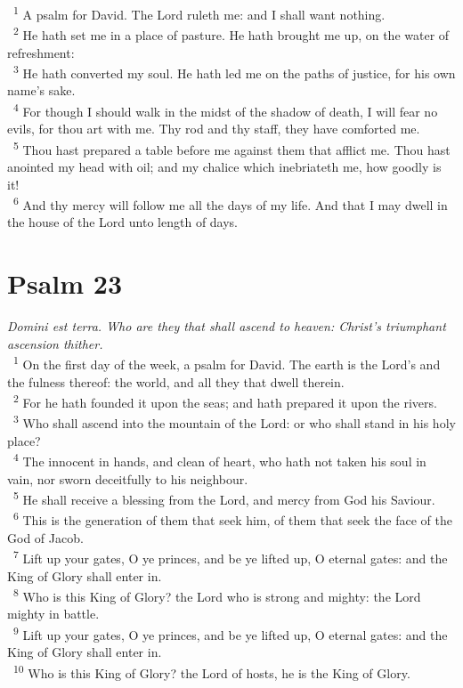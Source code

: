 \documentclass[a5paper,12pt]{article}
\begin{document}
\begin{multicols*}{2}
~\textsuperscript{1} A psalm for David. The Lord ruleth me: and I shall want nothing.\\
~\textsuperscript{2} He hath set me in a place of pasture. He hath brought me up, on the water of refreshment:\\
~\textsuperscript{3} He hath converted my soul. He hath led me on the paths of justice, for his own name's sake.\\
~\textsuperscript{4} For though I should walk in the midst of the shadow of death, I will fear no evils, for thou art with me. Thy rod and thy staff, they have comforted me.\\
~\textsuperscript{5} Thou hast prepared a table before me against them that afflict me. Thou hast anointed my head with oil; and my chalice which inebriateth me, how goodly is it!\\
~\textsuperscript{6} And thy mercy will follow me all the days of my life. And that I may dwell in the house of the Lord unto length of days.\\

\section{Psalm 23}
\label{sec:org490bbd7}
\emph{Domini est terra. Who are they that shall ascend to heaven: Christ's triumphant ascension thither.}\\

~\textsuperscript{1} On the first day of the week, a psalm for David. The earth is the Lord's and the fulness thereof: the world, and all they that dwell therein.\\
~\textsuperscript{2} For he hath founded it upon the seas; and hath prepared it upon the rivers.\\
~\textsuperscript{3} Who shall ascend into the mountain of the Lord: or who shall stand in his holy place?\\
~\textsuperscript{4} The innocent in hands, and clean of heart, who hath not taken his soul in vain, nor sworn deceitfully to his neighbour.\\
~\textsuperscript{5} He shall receive a blessing from the Lord, and mercy from God his Saviour.\\
~\textsuperscript{6} This is the generation of them that seek him, of them that seek the face of the God of Jacob.\\
~\textsuperscript{7} Lift up your gates, O ye princes, and be ye lifted up, O eternal gates: and the King of Glory shall enter in.\\
~\textsuperscript{8} Who is this King of Glory? the Lord who is strong and mighty: the Lord mighty in battle.\\
~\textsuperscript{9} Lift up your gates, O ye princes, and be ye lifted up, O eternal gates: and the King of Glory shall enter in.\\
~\textsuperscript{10} Who is this King of Glory? the Lord of hosts, he is the King of Glory.\\


\end{multicols*}
\end{document}

